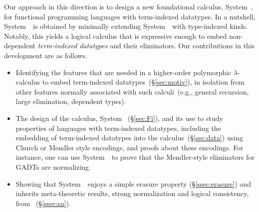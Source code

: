 Our approach in this direction is to design a new foundational calculus,
System~\Fi, for functional programming languages with term-indexed
datatypes.  In a nutshell, System~\Fi\ is obtained by minimally extending
System~\Fw\ with type-indexed kinds.  Notably, this yields a logical
calculus that is expressive enough to embed non-dependent
\emph{term-indexed datatypes} and their eliminators. Our contributions in
this development are as follows.\vspace*{-.8ex}
\begin{itemize}
\item 
  Identifying the features that are needed in a higher-order polymorphic
  $\lambda$-calculus to embed term-indexed datatypes~(\S\ref{sec:motiv}),
  in isolation from other features normally associated with such
  calculi~(e.g., general recursion, large elimination, dependent types).
\item 
  The design of the calculus, System \Fi\ (\S\ref{sec:Fi}), and its use to
  study properties of languages with term-indexed datatypes, including
  the embedding of
  term-indexed datatypes into the calculus~(\S\ref{sec:data}) using
  Church or Mendler style encodings, and  proofs about these encodings.
  For instance, one can use System~\Fi\ to prove that
  the Mendler-style eliminators for GADTs
  \cite{AhnShe11} are normalizing.
\item 
  Showing that System~\Fi\ enjoys a simple erasure
  property (\S\ref{ssec:erasure}) 
  and inherits meta-theoretic results,
  strong normalization and logical consistency, from \Fw\ (\S\ref{ssec:sn}).
\end{itemize}\vspace*{-3pt}


